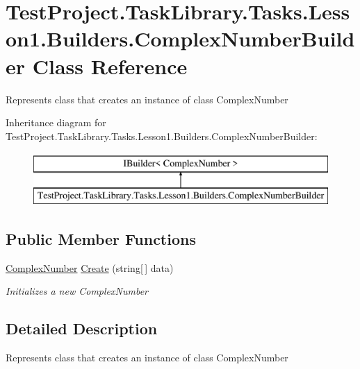 \hypertarget{class_test_project_1_1_task_library_1_1_tasks_1_1_lesson1_1_1_builders_1_1_complex_number_builder}{}\section{Test\+Project.\+Task\+Library.\+Tasks.\+Lesson1.\+Builders.\+Complex\+Number\+Builder Class Reference}
\label{class_test_project_1_1_task_library_1_1_tasks_1_1_lesson1_1_1_builders_1_1_complex_number_builder}


Represents class that creates an instance of class Complex\+Number  


Inheritance diagram for Test\+Project.\+Task\+Library.\+Tasks.\+Lesson1.\+Builders.\+Complex\+Number\+Builder\+:\begin{figure}[H]
\begin{center}
\leavevmode
\includegraphics[height=2.000000cm]{class_test_project_1_1_task_library_1_1_tasks_1_1_lesson1_1_1_builders_1_1_complex_number_builder}
\end{center}
\end{figure}
\subsection*{Public Member Functions}
\begin{DoxyCompactItemize}
\item 
\mbox{\hyperlink{class_test_project_1_1_task_library_1_1_tasks_1_1_lesson1_1_1_models_1_1_complex_number}{Complex\+Number}} \mbox{\hyperlink{class_test_project_1_1_task_library_1_1_tasks_1_1_lesson1_1_1_builders_1_1_complex_number_builder_a66ac5b11d083ddb0f0d52d08ed75e3d8}{Create}} (string\mbox{[}$\,$\mbox{]} data)
\begin{DoxyCompactList}\small\item\em Initializes a new Complex\+Number \end{DoxyCompactList}\end{DoxyCompactItemize}


\subsection{Detailed Description}
Represents class that creates an instance of class Complex\+Number 



